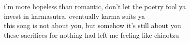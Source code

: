 i'm more hopeless than romantic, don't let the poetry fool ya\\invest in
karmasutra, eventually karma suits ya\\this song is not about you, but
somehow it's still about you\\these sacrifices for nothing had left me
feeling like chiaotzu
